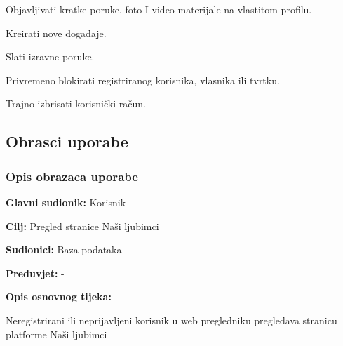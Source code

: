 \begin{packed_enum}
				\begin{packed_enum}
					
					\item Objavljivati kratke poruke, foto I video materijale na vlastitom profilu.
					\item Kreirati nove događaje.
					\item Slati izravne poruke.
					
				\end{packed_enum}
			
				\item  {}
				
				\begin{packed_enum}
					
					\item Privremeno blokirati registriranog korisnika, vlasnika ili tvrtku.
					\item Trajno izbrisati korisnički račun. 
					
				\end{packed_enum}
				
			\end{packed_enum}
			
			\eject 
			
			
				
			\subsection{Obrasci uporabe}
				
				
				\subsubsection{Opis obrazaca uporabe}

					\noindent {}
					\begin{packed_item}
	
						\item \textbf{Glavni sudionik: } Korisnik
						\item  \textbf{Cilj:} Pregled stranice Naši ljubimci
						\item  \textbf{Sudionici:} Baza podataka
						\item  \textbf{Preduvjet:} -
						\item  \textbf{Opis osnovnog tijeka:}
						
						\item[] \begin{packed_enum}
	
							\item Neregistrirani ili neprijavljeni korisnik u web pregledniku pregledava stranicu platforme Naši ljubimci 
			
						\end{packed_enum}
						
					\end{packed_item}
				
